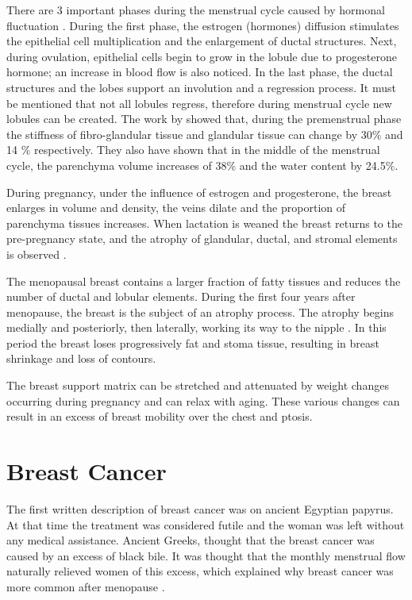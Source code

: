 There are 3 important phases during the menstrual cycle caused by hormonal fluctuation \citep{andolina2011mammographic}. During the first phase, the estrogen (hormones) diffusion stimulates the epithelial cell multiplication and the enlargement of ductal structures. Next, during ovulation, epithelial cells begin to grow in the lobule due to progesterone hormone; an increase in blood flow is also noticed. In the last phase, the ductal structures and the lobes support an involution and a regression process. It must be mentioned that not all lobules regress, therefore during menstrual cycle new lobules can be created.   The work by \cite{lorenzen_menstrual-cycle_2003} showed that, during the premenstrual phase the stiffness of fibro-glandular tissue and glandular tissue can change by 30\% and 14 \% respectively. They also have shown that in the middle of the menstrual cycle, the parenchyma volume increases of 38\% and the water content by 24.5\%.

During pregnancy, under the influence of estrogen and progesterone, the breast enlarges in volume and density, the veins dilate and the proportion of parenchyma tissues increases.  When lactation is weaned the breast returns to the pre-pregnancy state, and the atrophy of glandular, ductal, and stromal elements  is observed \citep{pandya_breast_2011}.

The menopausal breast contains a larger fraction of fatty tissues and reduces the number of ductal and lobular elements. During the first four years after menopause, the breast is the subject of an atrophy process. The atrophy begins medially and posteriorly, then laterally, working its way to the nipple \citep{andolina2011mammographic}. In this period the breast loses progressively fat and stoma tissue, resulting in breast shrinkage and loss of contours.

 The breast support matrix can be stretched and attenuated by weight changes occurring during pregnancy and can relax with aging. These various changes can result in an excess of breast mobility over the chest and ptosis. 

\section{Breast Cancer}\label{section:breastcancer}

The first written description of breast cancer was on ancient Egyptian papyrus. At that time the treatment was considered futile and the woman was left without any medical assistance. Ancient Greeks, thought that the breast cancer was caused by an excess of black bile. It was thought that the monthly menstrual flow naturally relieved women of this excess, which explained why breast cancer was more common after menopause \citep{andolina2011mammographic}.

